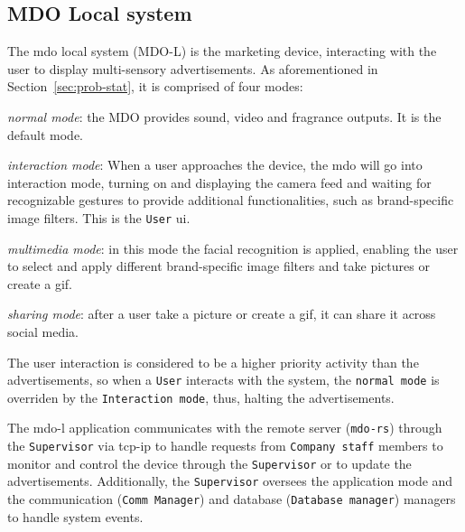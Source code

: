 \subsection{MDO Local system}
\label{sec:mdo-local-system}
The \gls{mdo} local system (MDO-L) is the marketing device, interacting with the user
to display multi-sensory advertisements. As aforementioned in
Section~\ref{sec:prob-stat}, it is comprised of four modes:
\begin{item-c}
\item \emph{normal mode}: the MDO provides sound, video and fragrance
  outputs. It is the default mode.
\item \emph{interaction mode}: When a user approaches the device, the \gls{mdo} will
go into interaction mode, turning on and displaying the camera feed and waiting
for recognizable gestures to provide additional functionalities, such as
brand-specific image filters. This is the \texttt{User} \gls{ui}.
\item \emph{multimedia mode}: in this mode the facial recognition is applied,
  enabling the user to select and apply different brand-specific image filters and take pictures or create a \gls{gif}.
\item \emph{sharing mode}: after a user take a picture or create a \gls{gif}, it
  can share it across social media.
\end{item-c}

The user interaction is considered to be a higher priority activity than the
advertisements, so when a \texttt{User} interacts with the system, the \texttt{normal
mode} is overriden by the \texttt{Interaction mode}, thus, halting the
advertisements.

The \gls{mdo-l} application communicates with the remote server
(\texttt{\gls{mdo-rs}}) through the \texttt{Supervisor} via \gls{tcp-ip}
 to handle requests from \texttt{Company staff} members
to monitor and control the device through the \texttt{Supervisor} or to update
the advertisements. Additionally, the \texttt{Supervisor} oversees the
application mode and the communication (\texttt{Comm Manager}) and database
(\texttt{Database manager}) managers to handle system events.


